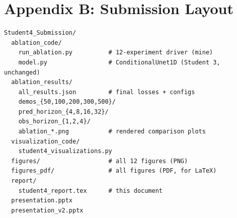 \documentclass[11pt]{article}
\begin{document}
\section*{Appendix B: Submission Layout}

\begin{verbatim}
Student4_Submission/
  ablation_code/
    run_ablation.py          # 12-experiment driver (mine)
    model.py                 # ConditionalUnet1D (Student 3, unchanged)
  ablation_results/
    all_results.json         # final losses + configs
    demos_{50,100,200,300,500}/
    pred_horizon_{4,8,16,32}/
    obs_horizon_{1,2,4}/
    ablation_*.png           # rendered comparison plots
  visualization_code/
    student4_visualizations.py
  figures/                   # all 12 figures (PNG)
  figures_pdf/               # all figures (PDF, for LaTeX)
  report/
    student4_report.tex      # this document
  presentation.pptx
  presentation_v2.pptx
\end{verbatim}
\end{document}
